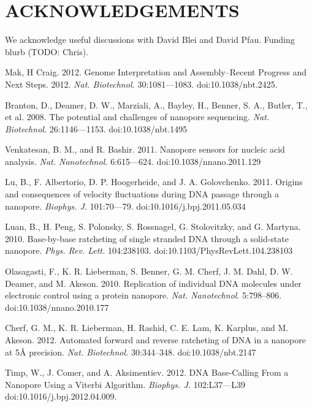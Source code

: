 \documentclass{biophys_letter}
\begin{document}
\section*{ACKNOWLEDGEMENTS}

We acknowledge useful discussions with David Blei and David Pfau. Funding blurb (TODO: Chris).

\begin{thebibliography}{99}

  Mak, H Craig. 
  2012.
  Genome Interpretation and Assembly--Recent Progress and Next Steps.
  2012.
  {\it Nat. Biotechnol.}
  30:1081---1083.
  doi:10.1038/nbt.2425.

  Branton, D., Deamer, D. W., Marziali, A., Bayley, H., Benner, S. A., Butler, T., et al.
  2008.
  The potential and challenges of nanopore sequencing.
  {\it Nat. Biotechnol.}
  26:1146---1153.
  doi:10.1038/nbt.1495

  Venkatesan, B. M., and R. Bashir.
  2011.
  Nanopore sensors for nucleic acid analysis.
  {\it Nat. Nanotechnol.}
  6:615---624.
  doi:10.1038/nnano.2011.129

  Lu, B., F. Albertorio, D. P. Hoogerheide, and J. A. Golovchenko.
  2011.
  Origins and consequences of velocity fluctuations during DNA passage through a nanopore.
  {\it Biophys. J.}
  101:70---79.
  doi:10.1016/j.bpj.2011.05.034

  Luan, B., H. Peng, S. Polonsky, S. Rossnagel, G. Stolovitzky, and G. Martyna.
  2010.
  Base-by-base ratcheting of single stranded DNA through a solid-state nanopore.
  {\it Phys. Rev. Lett.}
  104:238103.
  doi:10.1103/PhysRevLett.104.238103

  Olasagasti, F., K. R. Lieberman, S. Benner, G. M. Cherf, J. M. Dahl, D. W. Deamer, and M. Akeson.
  2010.
  Replication of individual DNA molecules under electronic control using a protein nanopore.
  {\it Nat. Nanotechnol.}
  5:798--806.
  doi:10.1038/nnano.2010.177

  Cherf, G. M., K. R. Lieberman, H. Rashid, C. E. Lam, K. Karplus, and M. Akeson.
  2012.
  Automated forward and reverse ratcheting of DNA in a nanopore at 5{\AA} precision.
  {\it Nat. Biotechnol.}
  30:344--348.
  doi:10.1038/nbt.2147

  Timp, W., J. Comer, and A. Aksimentiev. 
  2012.
  DNA Base-Calling From a Nanopore Using a Viterbi Algorithm.
  {\it Biophys. J.}
  102:L37---L39
  doi:10.1016/j.bpj.2012.04.009.


\end{thebibliography}
\end{document}
